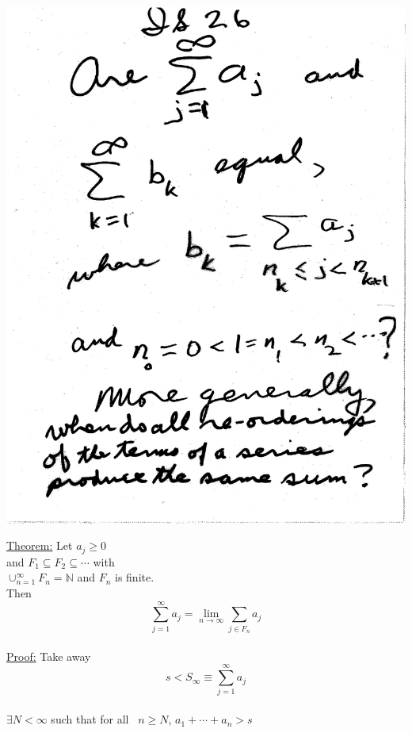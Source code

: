 \documentclass[10pt,a4paper]{article}
\begin{document}
{{\includegraphics[scale=.5]{Pages/IS_26}

\newpage

\noindent \underline{Theorem:} Let $a_j \geq 0$
\\ and $F_1 \subseteq F_2 \subseteq \cdots $ with
\\ $ \cup_{n=1}^{\infty} F_n = \mathbb{N} $ and $F_n$ is finite.
\\ Then $$\sum_{j=1}^{\infty} a_j = \lim_{n \rightarrow \infty} \sum_{j \in F_n} a_j$$
\vspace{5mm}
\\ \underline{Proof:} Take away
\\ $$ s < S_{\infty} \equiv \sum_{j=1}^{\infty} a_j$$
\\ $ \exists N < \infty$ such that for all 
\ $ n \geq N$, $a_1 + \cdots + a_n > s$

}}
\end{document}

